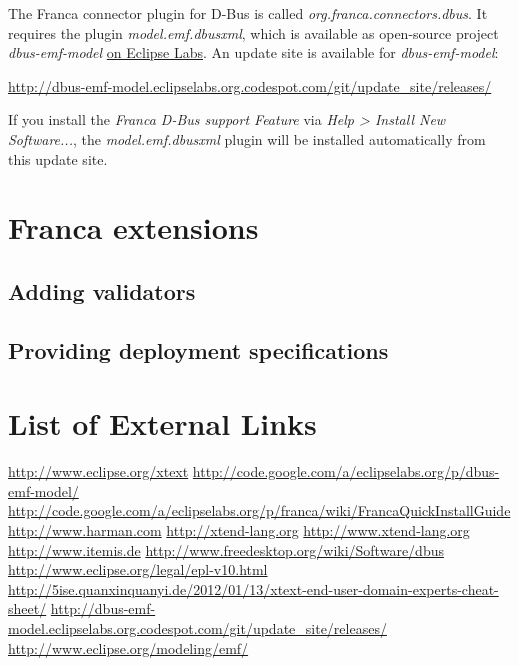 \documentclass[a4paper,10pt]{scrreprt}
\begin{document}
The Franca connector plugin for D-Bus is called \textit{org.franca.connectors.dbus}.
It requires the plugin \textit{model.emf.dbusxml}, which is available as open-source
project \textit{dbus-emf-model}
\href{http://code.google.com/a/eclipselabs.org/p/dbus-emf-model/}{on Eclipse Labs}.
An update site is available for \textit{dbus-emf-model}:

\href{http://dbus-emf-model.eclipselabs.org.codespot.com/git/update_site/releases/}{
	 http://dbus-emf-model.eclipselabs.org.codespot.com/git/update\_site/releases/}

If you install the \textit{Franca D-Bus support Feature} via \textit{Help > Install New Software...},
the \textit{model.emf.dbusxml} plugin will be installed automatically from this update site.


\chapter{Franca extensions}
\label{FrancaExtensions}
\section{Adding validators}
\label{FrancaExtensions_Validators}
\section{Providing deployment specifications}
\label{FrancaExtensions_ImplicitDeploymentSpecs}
\chapter{List of External Links}
\noindent\url{http://www.eclipse.org/xtext}
\noindent\url{http://code.google.com/a/eclipselabs.org/p/dbus-emf-model/}
\noindent\url{http://code.google.com/a/eclipselabs.org/p/franca/wiki/FrancaQuickInstallGuide}
\noindent\url{http://www.harman.com}
\noindent\url{http://xtend-lang.org}
\noindent\url{http://www.xtend-lang.org}
\noindent\url{http://www.itemis.de}
\noindent\url{http://www.freedesktop.org/wiki/Software/dbus}
\noindent\url{http://www.eclipse.org/legal/epl-v10.html}
\noindent\url{http://5ise.quanxinquanyi.de/2012/01/13/xtext-end-user-domain-experts-cheat-sheet/}
\noindent\url{http://dbus-emf-model.eclipselabs.org.codespot.com/git/update_site/releases/}
\noindent\url{http://www.eclipse.org/modeling/emf/}

\listoftodos
\end{document}
